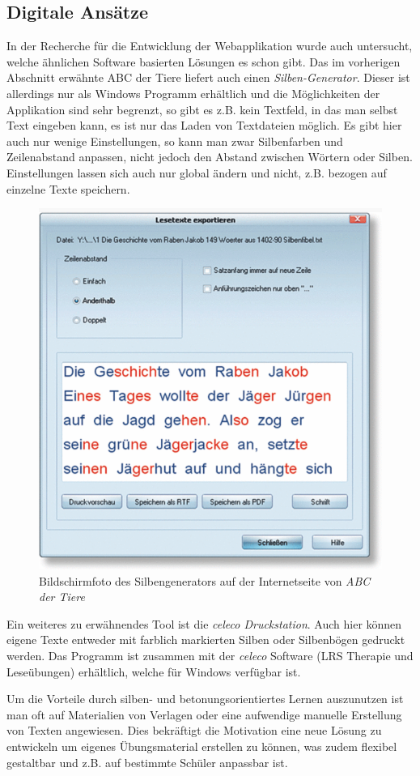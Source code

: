 \subsection{Digitale Ansätze}

In der Recherche für die Entwicklung der Webapplikation wurde auch untersucht, welche ähnlichen Software basierten Lösungen es schon gibt. Das im vorherigen Abschnitt erwähnte ABC der Tiere liefert auch einen \textit{Silben-Generator}\cite{ABCSilbengenerator2018}. Dieser ist allerdings nur als Windows Programm erhältlich und die Möglichkeiten der Applikation sind sehr begrenzt, so gibt es z.B. kein Textfeld, in das man selbst Text eingeben kann, es ist nur das Laden von Textdateien möglich. Es gibt hier auch nur wenige Einstellungen, so kann man zwar Silbenfarben und Zeilenabstand anpassen, nicht jedoch den Abstand zwischen Wörtern oder Silben. Einstellungen lassen sich auch nur global ändern und nicht, z.B. bezogen auf einzelne Texte speichern.\\

\begin{figure}[h!]
	\centering
	\includegraphics[width=.5\linewidth]{figures/ABCsilbengenerator}
	\caption{Bildschirmfoto des Silbengenerators auf der Internetseite von \textit{ABC der Tiere}\cite{ABCSilbengenerator2018}}
	\label{fig:ABCsilbengenerator}
\end{figure}

Ein weiteres zu erwähnendes Tool ist die \textit{celeco Druckstation}\cite{celeco2018}. Auch hier können eigene Texte entweder mit farblich markierten Silben oder Silbenbögen gedruckt werden. Das Programm ist zusammen mit der \textit{celeco} Software (LRS Therapie und Leseübungen) erhältlich, welche für Windows verfügbar ist.

Um die Vorteile durch silben- und betonungsorientiertes Lernen auszunutzen ist man oft auf Materialien von Verlagen oder eine aufwendige manuelle Erstellung von Texten angewiesen. Dies bekräftigt die Motivation eine neue Lösung zu entwickeln um eigenes Übungsmaterial erstellen zu können, was zudem flexibel gestaltbar und z.B. auf bestimmte Schüler anpassbar ist. 

